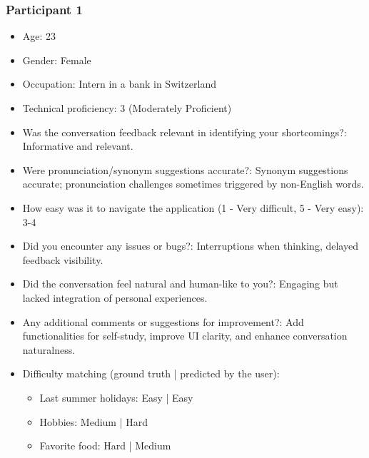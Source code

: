 \documentclass{article}
\begin{document}
\subsubsection{Participant 1}
\begin{itemize}
    \item Age: 23
    \item Gender: Female
    \item Occupation: Intern in a bank in Switzerland
    \item Technical proficiency: 3 (Moderately Proficient)
    \item Was the conversation feedback relevant in identifying your shortcomings?: Informative and relevant.
    \item Were pronunciation/synonym suggestions accurate?: Synonym suggestions accurate; pronunciation challenges sometimes triggered by non-English words.
    \item How easy was it to navigate the application (1 - Very difficult, 5 - Very easy): 3-4
    \item Did you encounter any issues or bugs?: Interruptions when thinking, delayed feedback visibility.
    \item Did the conversation feel natural and human-like to you?: Engaging but lacked integration of personal experiences.
    \item Any additional comments or suggestions for improvement?: Add functionalities for self-study, improve UI clarity, and enhance conversation naturalness.
    \item Difficulty matching (ground truth | predicted by the user):
    \begin{itemize}
        \item Last summer holidays: Easy | Easy
        \item Hobbies: Medium | Hard
        \item Favorite food: Hard | Medium
    \end{itemize}
\end{itemize}
\end{document}
